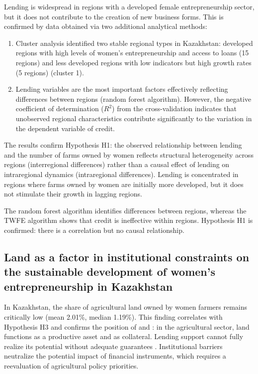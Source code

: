 ﻿\documentclass[pdflatex,sn-mathphys-ay]{sn-jnl}
\begin{document}
Lending is widespread in regions with a developed female
entrepreneurship sector, but it does not contribute to the creation of
new business forms. This is confirmed by data obtained via two
additional analytical methods:

\begin{enumerate}
\item Cluster analysis identified two stable regional types in
Kazakhstan: developed regions with high levels of women's
entrepreneurship and access to loans (15 regions) and less developed
regions with low indicators but high growth rates (5 regions)
(cluster 1).

\item Lending variables are the most important factors effectively
reflecting differences between regions (random forest algorithm).
However, the negative coefficient of determination ($R^2$) from the
cross-validation indicates that unobserved regional characteristics
contribute significantly to the variation in the dependent variable of
credit.
\end{enumerate}

The results confirm Hypothesis H1: the observed relationship between
lending and the number of farms owned by women reflects structural
heterogeneity across regions (interregional differences) rather than a
causal effect of lending on intraregional dynamics (intraregional
differences). Lending is concentrated in regions where farms owned by
women are initially more developed, but it does not stimulate their
growth in lagging regions.

The random forest algorithm identifies differences between regions,
whereas the TWFE algorithm shows that credit is ineffective within
regions. Hypothesis H1 is confirmed: there is a correlation but no
causal relationship.

\subsection{Land as a factor in institutional constraints on the sustainable development of women's entrepreneurship in Kazakhstan}

In Kazakhstan, the share of agricultural land owned by women farmers
remains critically low (mean 2.01\%, median 1.19\%). This finding
correlates with Hypothesis H3 and confirms the position of
\citet{ref20} and \citet{ref06}: in the agricultural sector, land
functions as a productive asset and as collateral. Lending support
cannot fully realize its potential without adequate guarantees
\citep{ref26,ref02}. Institutional barriers
neutralize the potential impact of financial instruments, which requires
a reevaluation of agricultural policy priorities.
\end{document}
